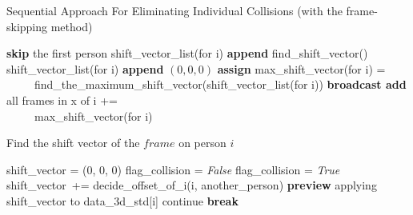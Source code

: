 \documentclass[11pt]{llncs}
\begin{document}
\begin{algorithm}[H]
  \caption{Sequential Approach For Eliminating Individual Collisions (with the frame-skipping method)}
  \SetAlgoLined
  
  {
  \textbf{skip} the first person\;
  	{
  		{
  			shift\_vector\_list(for i)  \textbf{append} find\_shift\_vector()\;
  		}
  		\Else
  		{
  			shift\_vector\_list(for i) \textbf{append} $(0,0,0)$\;
  		}
  	}
	\textbf{assign} max\_shift\_vector(for i) = \\ \ \ \ \ \ find\_the\_maximum\_shift\_vector(shift\_vector\_list(for i))\;
  	 \textbf{broadcast add} all frames in x of i += \\ \ \ \ \ \ max\_shift\_vector(for i)
  }

 \;
\end{algorithm}

\begin{algorithm}[H]
  \caption{Find the shift vector of the $frame$ on person $i$}
  \SetAlgoLined
  
  
  shift\_vector = (0, 0, 0)\;
  {
  	flag\_collision = \textit{False}\;
  	{
		{
			flag\_collision = \textit{True}\;
			shift\_vector\ += decide\_offset\_of\_i(i, another\_person)\;
			\textbf{preview} applying shift\_vector to data\_3d\_std[i]\;
			continue\;
		}
  	}
	{
		\textbf{break}\;
	}
  }

 \;
\end{algorithm}




\end{document}
